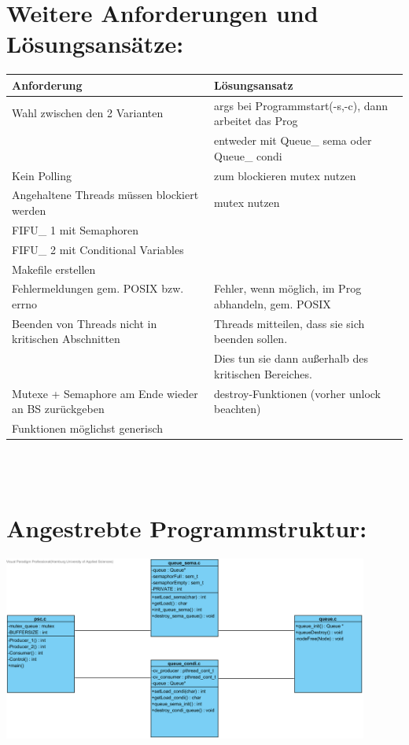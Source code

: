 \documentclass[paper=a4, fontsize=12pt]{article}
\begin{document}
\section{Weitere Anforderungen und Lösungsansätze:}
\begin{tabular}{l|l}
Anforderung & Lösungsansatz \\
\hline
Wahl zwischen den 2 Varianten &  args bei Programmstart(-s,-c), dann arbeitet das Prog \\
  & entweder mit Queue\_ sema oder Queue\_ condi\\
\hline
Kein Polling & zum blockieren mutex nutzen \\ 
\hline
Angehaltene Threads müssen blockiert werden & mutex nutzen \\ 
\hline
FIFU\_ 1 mit Semaphoren &  \\ 
\hline
FIFU\_ 2 mit Conditional Variables & \\
\hline
Makefile erstellen &  \\
\hline
Fehlermeldungen gem. POSIX bzw. errno & Fehler, wenn möglich, im Prog abhandeln, gem. POSIX \\
\hline
Beenden von Threads nicht in kritischen Abschnitten & Threads mitteilen, dass sie sich beenden sollen.\\
  & Dies tun sie dann außerhalb des kritischen Bereiches. \\
\hline
Mutexe + Semaphore am Ende wieder an BS zurückgeben & destroy-Funktionen (vorher unlock beachten) \\
\hline
Funktionen möglichst generisch &  \\
\end{tabular}
\\
\\
\section{Angestrebte Programmstruktur:}
\includegraphics[width=0.9\textwidth]{Entwurf v1-0.png}
\end{document}
